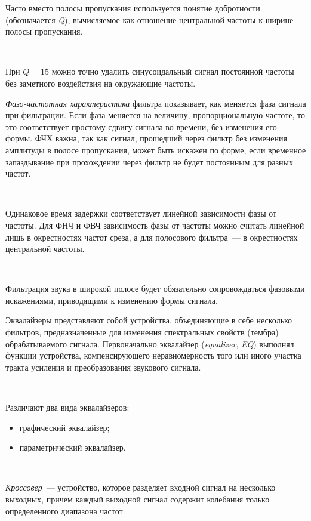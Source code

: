 \documentclass{beamer}
\begin{document}
\begin{frame}
Часто вместо полосы пропускания используется понятие добротности (обозначается \emph{Q}), вычисляемое как отношение центральной частоты к ширине полосы пропускания. 

~

При $Q=15$ можно точно удалить синусоидальный сигнал постоянной частоты без заметного воздействия на окружающие частоты.

\end{frame}

\begin{frame}
\emph{Фазо-частотная характеристика} фильтра показывает, как меняется фаза сигнала при фильтрации. Если фаза меняется на величину, пропорциональную частоте, то это соответствует простому сдвигу сигнала во времени, без изменения его формы. ФЧХ важна, так как сигнал, прошедший через фильтр без изменения амплитуды в полосе пропускания, может быть искажен по форме, если временное запаздывание при прохождении через фильтр не будет постоянным для разных частот.

~

Одинаковое время задержки соответствует линейной зависимости фазы от частоты. Для ФНЧ и ФВЧ зависимость фазы от частоты можно считать линейной лишь в окрестностях частот среза, а для полосового фильтра~--- в окрестностях центральной частоты.

~

Фильтрация звука в широкой полосе будет обязательно сопровождаться фазовыми искажениями, приводящими к изменению формы сигнала.
\end{frame}

\begin{frame}
Эквалайзеры представляют собой устройства, объединяющие в себе несколько фильтров, предназначенные для изменения спектральных свойств (тембра) обрабатываемого сигнала. Первоначально эквалайзер (\emph{equalizer}, \emph{EQ}) выполнял функции устройства, компенсирующего неравномерность того или иного участка тракта усиления и преобразования звукового сигнала.

~

Различают два вида эквалайзеров:
\begin{itemize}
  \item графический эквалайзер;
  \item параметрический эквалайзер.
\end{itemize}

~

\emph{Кроссовер}~--- устройство, которое разделяет входной сигнал на несколько выходных, причем каждый выходной сигнал содержит колебания только определенного диапазона частот.
\end{frame}
\end{document}
